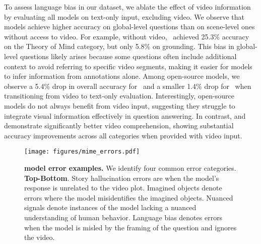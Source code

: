 To assess language bias in our dataset, we ablate the effect of video information by evaluating all models on text-only input, excluding video. We observe that models achieve higher accuracy on global-level questions than on scene-level ones without access to video. For example, without video, \llava~achieved 25.3\% accuracy on the Theory of Mind category, but only 5.8\% on grounding. This bias in global-level questions likely arises because some questions often include additional context to avoid referring to specific video segments, making it easier for models to infer information from annotations alone. Among open-source models, we observe a 5.4\% drop in overall accuracy for \qwen~and a smaller 1.4\% drop for \llava~when transitioning from video to text-only evaluation. Interestingly, open-source models do not always benefit from video input, suggesting they struggle to integrate visual information effectively in question answering. In contrast, {\gpt} and {\gemini} demonstrate significantly better video comprehension, showing substantial accuracy improvements across all categories when provided with video input.

\begin{table}[t!]
\centering
\vspace{-0mm}
\vspace{2mm}
\caption{\textbf{Model performance on videos with and without text.} Text in the video frames is detected automatically with manual verification. All models except for {\llava} have significantly improved performance on videos containing text.}
\vspace{-2mm}
\label{tab:models_text}
\end{table}

\begin{figure*}[ht]
    \centering
    \vspace{-4mm}
    \texttt{[image: figures/mime\_errors.pdf]}
    \caption{\textbf{{\data} model error examples.} We identify four common error categories. \textbf{Top-Bottom}. Story hallucination errors are when the model's response is unrelated to the video plot. Imagined objects denote errors where the model misidentifies the imagined objects. Nuanced signals denote instances of the model lacking a nuanced understanding of human behavior. Language bias denotes errors when the model is misled by the framing of the question and ignores the video.}
    \vspace{-4mm}
    \label{fig:error_examples}
\end{figure*}

